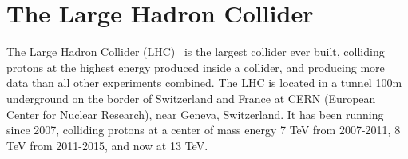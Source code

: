



\section{The Large Hadron Collider}

The Large Hadron Collider (LHC)~\cite{lhcbrochure} is the largest collider ever built, colliding protons at the highest energy produced inside a collider, and producing more data than all other experiments combined. The LHC is located in a tunnel 100m underground on the border of Switzerland and France at CERN (European Center for Nuclear Research), near Geneva, Switzerland. It has been running since 2007, colliding protons at a center of mass energy 7 TeV from 2007-2011, 8 TeV from 2011-2015, and now at 13 TeV. 

